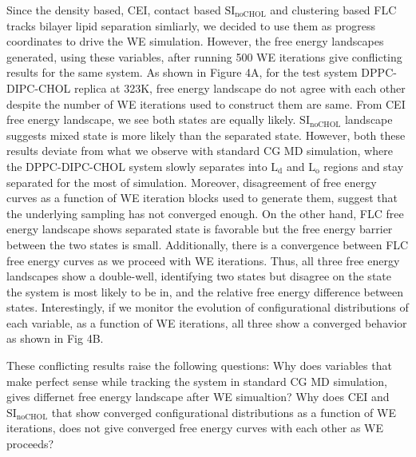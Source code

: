 \documentclass{biophys-new}
\begin{document}
Since the density based, CEI, contact based $\text{SI}_{\text{noCHOL}}$ and clustering based FLC tracks bilayer lipid separation simliarly,
we decided to use them as progress coordinates to drive the WE simulation.
However, the free energy landscapes generated, using these variables, after running 500 WE iterations give conflicting results for the same system.
As shown in Figure 4A, for the test system DPPC-DIPC-CHOL replica at 323K, free energy landscape do not agree with each other despite the number of WE iterations used to construct them are same.
From CEI free energy landscape, we see both states are equally likely.
$\text{SI}_{\text{noCHOL}}$ landscape suggests mixed state is more likely than the separated state.
However, both these results deviate from what we observe with standard CG MD simulation,
where the DPPC-DIPC-CHOL system slowly separates into $\text{L}_{\text{d}}$ and $\text{L}_{\text{o}}$ regions and stay separated for the most of simulation.
Moreover, disagreement of free energy curves as a function of WE iteration blocks used to generate them, suggest that the underlying sampling has not converged enough.
On the other hand, FLC free energy landscape shows separated state is favorable but the free energy barrier between the two states is small.
Additionally, there is a convergence between FLC free energy curves as we proceed with WE iterations.
Thus, all three free energy landscapes show a double-well, identifying two states but disagree on the state the system is most likely to be in, and the relative free energy difference between states.
Interestingly, if we monitor the evolution of configurational distributions of each variable, as a function of WE iterations, all three show a converged behavior as shown in Fig 4B.

These conflicting results raise the following questions: Why does variables that make perfect sense while tracking the system in standard CG MD simulation, gives differnet free energy landscape after WE simualtion?
Why does CEI and $\text{SI}_{\text{noCHOL}}$ that show converged configurational distributions as a function of WE iterations, does not give converged free energy curves with each other as WE proceeds?
\end{document}
